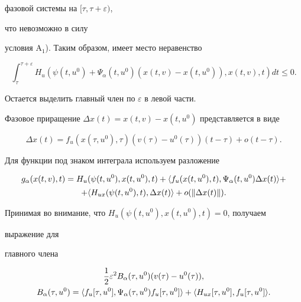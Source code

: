фазовой системы на $[\tau,\tau+\varepsilon)$, 


что невозможно в силу 


условия A${}_1$). Таким образом, имеет место неравенство 


\begin{equation} 


\int^{\tau+\varepsilon}_\tau H_u(\psi(t,u^0)+\Psi_\alpha 


(t,u^0)(x(t,v)-x(t,u^0)),x(t,v),t)dt\le 0. 


\end{equation} 


Остается выделить главный член по $\varepsilon$ в левой части. 


Фазовое приращение $\Delta x(t)=x(t,v)-x(t,u^0)$ представляется в виде 


$$ 


\Delta x(t)=f_u(x(\tau,u^0),\tau)(v(\tau)- 


u^0(\tau))(t-\tau)+o(t-\tau). 


$$ 


Для функции под знаком интеграла используем разложение 


\begin{multline*} 


g_\alpha(x(t,v),t)=H_u(\psi(t,u^0),x(t,u^0),t)+ 


\la f_u(x(t,u^0),t),\Psi_\alpha(t,u^0) 


\Delta x(t)\ra + \\ 


+\la H_{ux}(\psi(t,u^0),t),\Delta x(t)\ra+ 


o(\|\Delta x(t)\|). 


\end{multline*} 


Принимая во внимание, что $H_u(\psi(t,u^0),x(t,u^0),t)=0$, получаем 


выражение для 


главного члена 


\begin{gather*} 


\frac{1}{2}\varepsilon^2B_\alpha(\tau,u^0)(v(\tau)-u^0(\tau)),\\ 


B_\alpha(\tau,u^0)=\la f_u[\tau,u^0],\Psi_\alpha 


(\tau,u^0)f_u[\tau,u^0]\ra+ 


\la H_{ux}[\tau,u^0],f_u[\tau,u^0]\ra. 


\end{gather*} 


